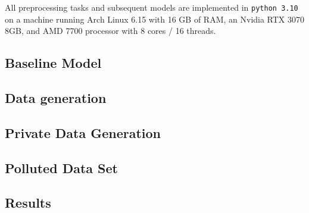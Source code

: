 All preprocessing tasks and subsequent models are implemented in \texttt{python 3.10} on a machine running Arch Linux 6.15 with 16 GB of RAM, an Nvidia RTX 3070 8GB, and AMD 7700 processor with 8 cores / 16 threads.


\subsection{Baseline Model}

\subsection{Data generation}

\subsection{Private Data Generation}


\subsection{Polluted Data Set}

\subsection{Results}